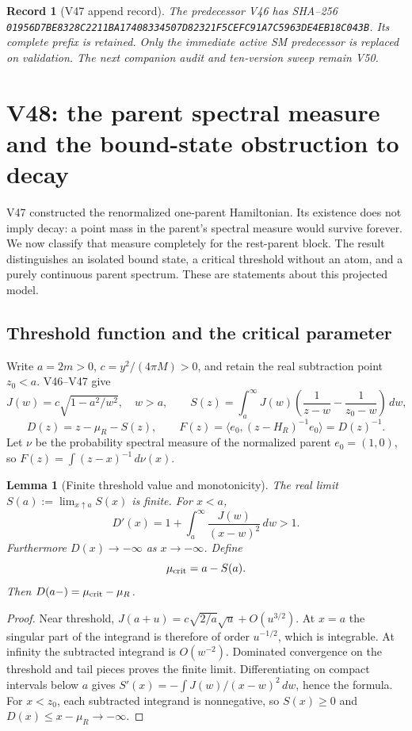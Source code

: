 \documentclass[11pt]{article}
\newtheorem{lemma}[theorem]{Lemma}
\newtheorem{record}[theorem]{Record}
\theoremstyle{remark}
\begin{document}
\begin{record}[V47 append record]
\label{rec:v20v47}
The predecessor V46 has SHA--256
\texttt{01956D7BE8328C2211BA17408334507D82321F5CEFC91A7C5963DE4EB18C043B}.
Its complete prefix is retained.  Only the immediate active SM
predecessor is replaced on validation.  The next companion audit
and ten-version sweep remain V50.
\end{record}



\section{V48: the parent spectral measure and the bound-state obstruction to decay}
\label{sec:v20v48}

V47 constructed the renormalized one-parent Hamiltonian.  Its existence
does not imply decay: a point mass in the parent's spectral measure
would survive forever.  We now classify that measure completely for
the rest-parent block.  The result distinguishes an isolated bound
state, a critical threshold without an atom, and a purely continuous
parent spectrum.  These are statements about this projected model.

\subsection{Threshold function and the critical parameter}

Write \(a=2m>0\), \(c=y^2/(4\pi M)>0\), and retain the real subtraction
point \(z_0<a\).  V46--V47 give
\[
 J(w)=c\sqrt{1-a^2/w^2},\quad w>a,\qquad
 S(z)=\int_a^\infty J(w)
 \left(\frac1{z-w}-\frac1{z_0-w}\right)\,dw,
\]
\[
 D(z)=z-\mu_R-S(z),\qquad
 F(z)=\langle e_0,(z-H_R)^{-1}e_0\rangle=D(z)^{-1}.
\]
Let \(\nu\) be the probability spectral measure of the normalized
parent \(e_0=(1,0)\), so \(F(z)=\int(z-x)^{-1}\,d\nu(x)\).

\begin{lemma}[Finite threshold value and monotonicity]
\label{lem:v20v48-threshold}
The real limit \(S(a):=\lim_{x\uparrow a}S(x)\) is finite.
For \(x<a\),
\[
 D'(x)=1+\int_a^\infty\frac{J(w)}{(x-w)^2}\,dw>1.
\]
Furthermore \(D(x)\to-\infty\) as \(x\to-\infty\).  Define
\[
 \mu_{\rm crit}=a-S(a).
\]
Then \(D(a-)=\mu_{\rm crit}-\mu_R\).
\end{lemma}
\begin{proof}
Near threshold, \(J(a+u)=c\sqrt{2/a}\sqrt u+O(u^{3/2})\).
At \(x=a\) the singular part of the integrand is therefore
of order \(u^{-1/2}\), which is integrable.  At infinity the
subtracted integrand is \(O(w^{-2})\).  Dominated convergence
on the threshold and tail pieces proves the finite limit.
Differentiating on compact intervals below \(a\) gives
\(S'(x)=-\int J(w)/(x-w)^2\,dw\), hence the formula.
For \(x<z_0\), each subtracted integrand is nonnegative, so
\(S(x)\geq0\) and \(D(x)\leq x-\mu_R\to-\infty\).
\end{proof}
\end{document}
